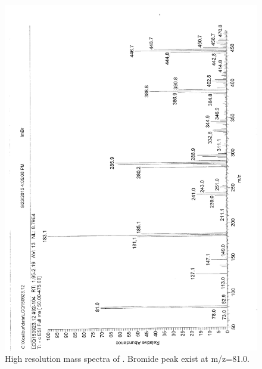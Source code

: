 \documentclass[journal=jacsat,manuscript=article]{achemso}
\begin{document}
\begin{figure}
\includegraphics[height=\textheight-2\baselineskip]{mass_PImBr.png}
\caption{High resolution mass spectra of . Bromide peak exist at m/z=81.0.}
\label{fig:massPImBr}
\end{figure}
\end{document}
